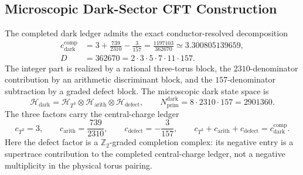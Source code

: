 \documentclass[11pt,letterpaper]{article}
\theoremstyle{plain}
\begin{document}
\subsection{Microscopic Dark-Sector CFT Construction}
\label{sec:section-three-microscopic-dark-cft}

The completed dark ledger admits the exact conductor-resolved decomposition
\begin{align}
\label{eq:section-three-dark-central-charge-decomposition}
 c_{\text{dark}}^{\text{comp}}
 &=
 3+\frac{739}{2310}-\frac{3}{157}
 =
 \frac{1197103}{362670}
 \simeq3.300805139659,
 \\
\label{eq:section-three-dark-conductor}
 D
 &=
 362670
 =
 2\cdot3\cdot5\cdot7\cdot11\cdot157.
\end{align}
The integer part is realized by a rational three-torus block, the
$2310$-denominator contribution by an arithmetic discriminant block, and the
$157$-denominator subtraction by a graded defect block.  The microscopic dark
state space is
\begin{equation}
\label{eq:section-three-dark-hilbert-factorization}
 \mathcal H_{\text{dark}}
 =
 \mathcal H_{T^3}
 \otimes
 \mathcal H_{\text{arith}}
 \otimes
 \mathcal H_{\text{defect}},
 \qquad
 N_{\text{prim}}^{\text{dark}}
 =
 8\cdot2310\cdot157
 =
 2901360.
\end{equation}
The three factors carry the central-charge ledger
\begin{equation}
\label{eq:section-three-dark-factor-ledger}
 c_{T^3}=3,
 \qquad
 c_{\text{arith}}=\frac{739}{2310},
 \qquad
 c_{\text{defect}}=-\frac{3}{157},
 \qquad
 c_{T^3}+c_{\text{arith}}+c_{\text{defect}}
 =c_{\text{dark}}^{\text{comp}}.
\end{equation}
Here the defect factor is a $\mathbb Z_2$-graded completion complex: its
negative entry is a supertrace contribution to the completed central-charge
ledger, not a negative multiplicity in the physical torus pairing.
\end{document}
